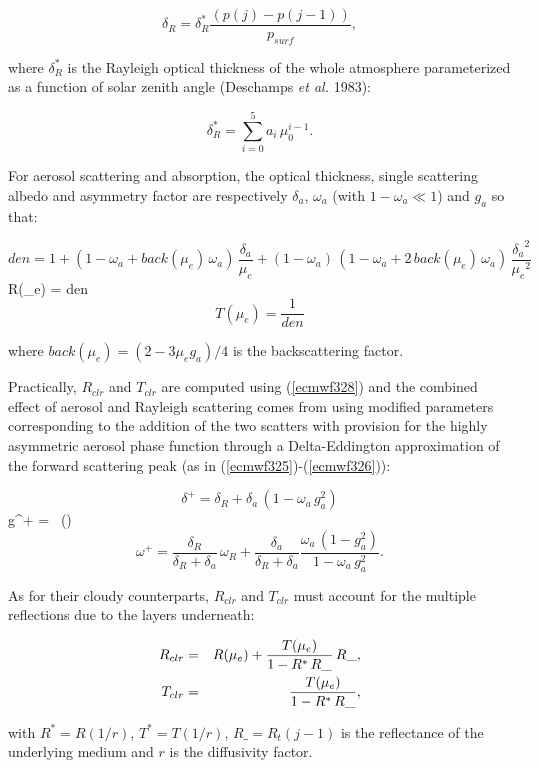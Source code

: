 \medskip
\[
\delta_R = \delta_R^{*} \frac{(p(j) - p(j-1))}{p_{surf}},
\]
\medskip

\noindent where $\delta_R^{*}$ is the Rayleigh optical thickness of the whole
atmosphere parameterized as a function of solar zenith angle
(Deschamps {\em et al.} 1983):

\[
\delta_R^{*} = \sum_{i=0}^5{a_i \, \mu_0^{i-1}}.
\]
\medskip

For aerosol scattering and absorption, the optical thickness, single scattering
albedo and asymmetry factor are respectively $\delta_a$, $\omega_a$ (with $1-\omega_a \ll 1$) and $g_a$ so that:

\medskip
\[
den = 1 + ( 1 - \omega_a + back(\mu_e) \, \omega_a ) \, \frac{\delta_a}{\mu_e} + ( 1 - \omega_a ) \, (1 - \omega_a + 2 \,  back(\mu_e) \, \omega_a ) \, \frac{{\delta_a}^2}{{\mu_e}^2}
\]
\be
R(\mu_e) =  {den}
\label{ecmwf328}
\ee
\[
T(\mu_e) = \frac{1}{den}
\]
\medskip

\noindent where $back(\mu_e) = (2 - 3 \mu_e g_a)/4$ is the
backscattering factor.

Practically, $R_{clr}$ and $T_{clr}$ are computed using (\ref{ecmwf328}) and the
combined effect of aerosol and Rayleigh scattering comes from using modified
parameters corresponding to the addition of the two scatters with provision for
the highly asymmetric aerosol phase function through a Delta-Eddington
approximation of the forward scattering peak
(as in (\ref{ecmwf325})-(\ref{ecmwf326})):

\medskip
\[
\delta^{+} = \delta_R + \delta_a \, (1 - \omega_a \, g_a^2)
\]
\be
g^{+} =  \, \bigl(\bigr)
\label{ecmwf329}
\ee
\[
\omega^{+} = \frac{\delta_R}{\delta_R + \delta_a} \, \omega_R + \frac{\delta_a}{\delta_R + \delta_a} \frac{\omega_a \, (1 - g_a^2)}{1 - \omega_a \, g_a^2}.
\]
\medskip

As for their cloudy counterparts, $R_{clr}$ and $T_{clr}$  must account for the multiple reflections due to the layers underneath:

\medskip
\begin{eqnarray}\label{ecmwf330}
R_{clr} &=& R(\mu_e) + \frac{T(\mu_e)}{1 - R^{*} \, R\_} \, R\_, \cr
T_{clr} &=& \frac{T(\mu_e)}{1 - R^{*} \, R\_},
\end{eqnarray}
\medskip

\noindent with $R^{*} = R ({1}/{r})$, $T^{*} = T ({1}/{r})$, $R\_ = R_t(j-1)$
is the reflectance of the underlying medium and $r$ is the diffusivity factor.

